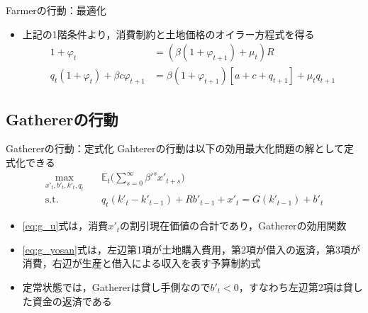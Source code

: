 \documentclass[aspectratio=169, dvipdfmx, 11pt, uplatex]{beamer}
\begin{document}
\begin{frame}{Farmerの行動：最適化}
  \begin{itemize}
    \item 上記の1階条件より，消費制約と土地価格のオイラー方程式を得る
      \begin{align}
        1 + \varphi_t &= (\beta(1+\varphi_{t+1}) + \mu_t) R \\
        q_t (1 + \varphi_t) + \beta c \varphi_{t+1} &= \beta(1 + \varphi_{t+1})[a + c + q_{t+1}] + \mu_t q_{t+1}
      \end{align}
  \end{itemize}
\end{frame}

\subsection{Gathererの行動}
\begin{frame}{Gathererの行動：定式化}
  Gahtererの行動は以下の効用最大化問題の解として定式化できる
  \begin{align}
    \max_{x'_t, b'_t, k'_t, q_t} \quad & \mathbb{E}_t \bigg( \sum_{s=0}^{\infty} \beta'^s x'_{t+s} \bigg) \label{eq:g_u} \\
\text{s.t.} \quad & q_t(k'_t - k'_{t-1}) + R b'_{t-1} + x'_t = G(k'_{t-1}) + b'_t \label{eq:g_yosan}
  \end{align}
  \begin{itemize}
    \item \eqref{eq:g_u}式は，消費$x'_t$の割引現在価値の合計であり，Gathererの効用関数
    \item \eqref{eq:g_yosan}式は，左辺第1項が土地購入費用，第2項が借入の返済，第3項が消費，右辺が生産と借入による収入を表す予算制約式
    \item 定常状態では，Gathererは貸し手側なので$b'_t < 0$，すなわち左辺第2項は貸した資金の返済である
  \end{itemize}
\end{frame}
\end{document}
